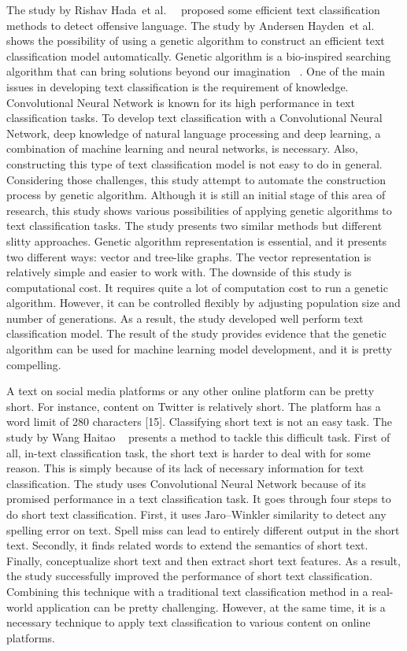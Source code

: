 \documentclass[11pt, natbib=false]{article}
\begin{document}
The study by Rishav Hada et al. ~\cite{hada2021ruddit} proposed some efficient text classification methods to detect offensive language.
The study by Andersen Hayden et al. ~\cite{andersen2021evolving} shows the possibility of using a genetic algorithm to construct an efficient text classification model automatically.
Genetic algorithm is a bio-inspired searching algorithm that can bring solutions beyond our imagination ~\cite{lehman2020surprising}.
One of the main issues in developing text classification is the requirement of knowledge.
Convolutional Neural Network is known for its high performance in text classification tasks. To develop text classification with a Convolutional Neural Network, deep knowledge of natural language processing and deep learning, a combination of machine learning and neural networks, is necessary.
Also, constructing this type of text classification model is not easy to do in general. Considering those challenges, this study attempt to automate the construction process by genetic algorithm.
Although it is still an initial stage of this area of research, this study shows various possibilities of applying genetic algorithms to text classification tasks.
The study presents two similar methods but different slitty approaches. Genetic algorithm representation is essential, and it presents two different ways: vector and tree-like graphs.
The vector representation is relatively simple and easier to work with.
The downside of this study is computational cost.
It requires quite a lot of computation cost to run a genetic algorithm.
However, it can be controlled flexibly by adjusting population size and number of generations.
As a result, the study developed well perform text classification model.
The result of the study provides evidence that the genetic algorithm can be used for machine learning model development, and it is pretty compelling. 

A text on social media platforms or any other online platform can be pretty short. For instance, content on Twitter is relatively short. The platform has a word limit of 280 characters [15].
Classifying short text is not an easy task.
The study by Wang Haitao ~\cite{wang2021short} presents a method to tackle this difficult task.
First of all, in-text classification task, the short text is harder to deal with for some reason. This is simply because of its lack of necessary information for text classification.
The study uses Convolutional Neural Network because of its promised performance in a text classification task. It goes through four steps to do short text classification.
First, it uses Jaro–Winkler similarity to detect any spelling error on text. Spell miss can lead to entirely different output in the short text.
Secondly, it finds related words to extend the semantics of short text. Finally, conceptualize short text and then extract short text features.
As a result, the study successfully improved the performance of short text classification.
Combining this technique with a traditional text classification method in a real-world application can be pretty challenging.
However, at the same time, it is a necessary technique to apply text classification to various content on online platforms. 
\end{document}

